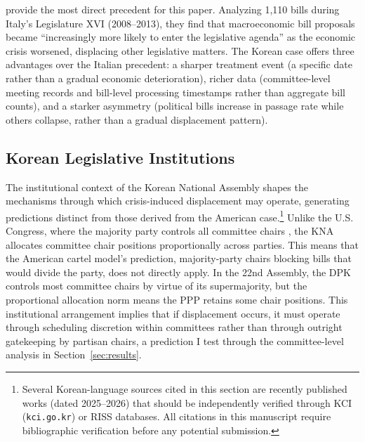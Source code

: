 \documentclass[11pt]{article}
\begin{document}
\citet{pedrazzani2018} provide the most direct precedent for this paper. Analyzing 1,110 bills during Italy's Legislature XVI (2008--2013), they find that macroeconomic bill proposals became ``increasingly more likely to enter the legislative agenda'' as the economic crisis worsened, displacing other legislative matters. The Korean case offers three advantages over the Italian precedent: a sharper treatment event (a specific date rather than a gradual economic deterioration), richer data (committee-level meeting records and bill-level processing timestamps rather than aggregate bill counts), and a starker asymmetry (political bills increase in passage rate while others collapse, rather than a gradual displacement pattern).

\subsection{Korean Legislative Institutions}

The institutional context of the Korean National Assembly shapes the mechanisms through which crisis-induced displacement may operate, generating predictions distinct from those derived from the American case.\footnote{Several Korean-language sources cited in this section are recently published works (dated 2025--2026) that should be independently verified through KCI (\texttt{kci.go.kr}) or RISS databases. All citations in this manuscript require bibliographic verification before any potential submission.} Unlike the U.S. Congress, where the majority party controls all committee chairs \citep{cox2005}, the KNA allocates committee chair positions proportionally across parties. This means that the American cartel model's prediction, majority-party chairs blocking bills that would divide the party, does not directly apply. In the 22nd Assembly, the DPK controls most committee chairs by virtue of its supermajority, but the proportional allocation norm means the PPP retains some chair positions. This institutional arrangement implies that if displacement occurs, it must operate through scheduling discretion within committees rather than through outright gatekeeping by partisan chairs, a prediction I test through the committee-level analysis in Section~\ref{sec:results}.
\end{document}
